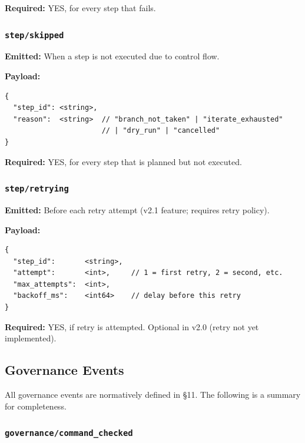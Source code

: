 \textbf{Required:} YES, for every step that fails.


\subsubsection{\texttt{step/skipped}}

\textbf{Emitted:} When a step is not executed due to control flow.

\textbf{Payload:}
\begin{verbatim}
{
  "step_id": <string>,
  "reason":  <string>  // "branch_not_taken" | "iterate_exhausted"
                       // | "dry_run" | "cancelled"
}
\end{verbatim}

\textbf{Required:} YES, for every step that is planned but not executed.


\subsubsection{\texttt{step/retrying}}

\textbf{Emitted:} Before each retry attempt (v2.1 feature; requires retry policy).

\textbf{Payload:}
\begin{verbatim}
{
  "step_id":       <string>,
  "attempt":       <int>,     // 1 = first retry, 2 = second, etc.
  "max_attempts":  <int>,
  "backoff_ms":    <int64>    // delay before this retry
}
\end{verbatim}

\textbf{Required:} YES, if retry is attempted. Optional in v2.0 (retry not yet implemented).


\subsection{Governance Events}

All governance events are normatively defined in §11. The following is a summary for completeness.

\subsubsection{\texttt{governance/command\_checked}}


